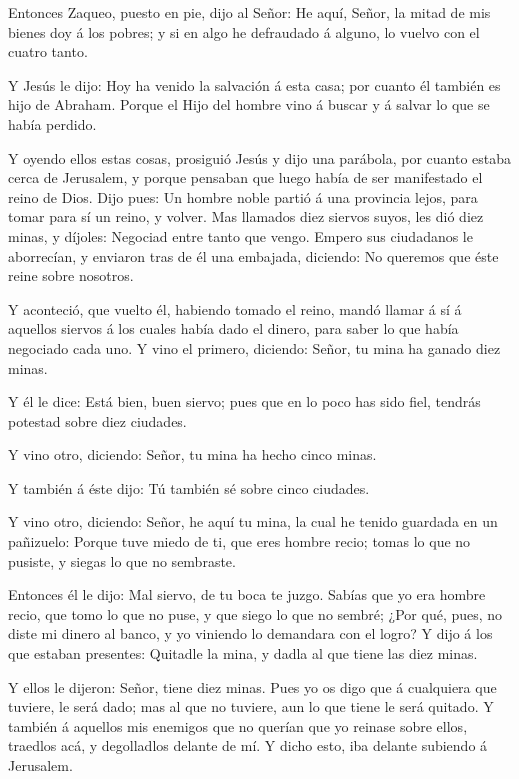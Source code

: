  Entonces Zaqueo, puesto en pie, dijo al Señor: He aquí,
Señor, la mitad de mis bienes doy á los pobres; y si en algo he
defraudado á alguno, lo vuelvo con el cuatro tanto.

 Y Jesús le dijo: Hoy ha venido la salvación á esta casa;
por cuanto él también es hijo de Abraham.  Porque el Hijo
del hombre vino á buscar y á salvar lo que se había perdido.

 Y oyendo ellos estas cosas, prosiguió Jesús y dijo una
parábola, por cuanto estaba cerca de Jerusalem, y porque pensaban que
luego había de ser manifestado el reino de Dios.  Dijo
pues: Un hombre noble partió á una provincia lejos, para tomar para sí
un reino, y volver.  Mas llamados diez siervos suyos, les
dió diez minas, y díjoles: Negociad entre tanto que vengo. 
Empero sus ciudadanos le aborrecían, y enviaron tras de él una embajada,
diciendo: No queremos que éste reine sobre nosotros.

 Y aconteció, que vuelto él, habiendo tomado el reino,
mandó llamar á sí á aquellos siervos á los cuales había dado el dinero,
para saber lo que había negociado cada uno.  Y vino el
primero, diciendo: Señor, tu mina ha ganado diez minas.

 Y él le dice: Está bien, buen siervo; pues que en lo poco
has sido fiel, tendrás potestad sobre diez ciudades.

 Y vino otro, diciendo: Señor, tu mina ha hecho cinco
minas.

 Y también á éste dijo: Tú también sé sobre cinco ciudades.

 Y vino otro, diciendo: Señor, he aquí tu mina, la cual he
tenido guardada en un pañizuelo:  Porque tuve miedo de ti,
que eres hombre recio; tomas lo que no pusiste, y siegas lo que no
sembraste.

 Entonces él le dijo: Mal siervo, de tu boca te juzgo.
Sabías que yo era hombre recio, que tomo lo que no puse, y que siego lo
que no sembré;  ¿Por qué, pues, no diste mi dinero al
banco, y yo viniendo lo demandara con el logro?  Y dijo á
los que estaban presentes: Quitadle la mina, y dadla al que tiene las
diez minas.

 Y ellos le dijeron: Señor, tiene diez minas. 
Pues yo os digo que á cualquiera que tuviere, le será dado; mas al que
no tuviere, aun lo que tiene le será quitado.  Y también á
aquellos mis enemigos que no querían que yo reinase sobre ellos,
traedlos acá, y degolladlos delante de mí.  Y dicho esto,
iba delante subiendo á Jerusalem.

